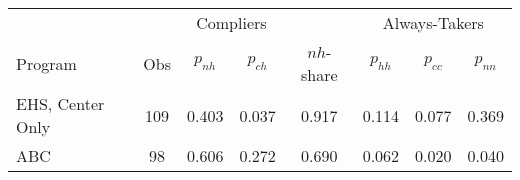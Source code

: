 \begin{tabular}{lccccccc}
\toprule 
\midrule 
\multicolumn{2}{c}{} & \multicolumn{2}{c}{Compliers} &  & \multicolumn{3}{c}{Always-Takers} \\
 \cmidrule(lr){3-4} \cmidrule(lr){6-8} 
Program & Obs & $p_{nh}$ & $p_{ch}$ & $nh$-share & $p_{hh}$ & $p_{cc}$ & $p_{nn}$ \\
\midrule 
EHS, Center Only & 109 & 0.403 & 0.037 & 0.917 & 0.114 & 0.077 & 0.369 \\
ABC & 98 & 0.606 & 0.272 & 0.690 & 0.062 & 0.020 & 0.040 \\
\midrule 
\bottomrule 
\end{tabular}
